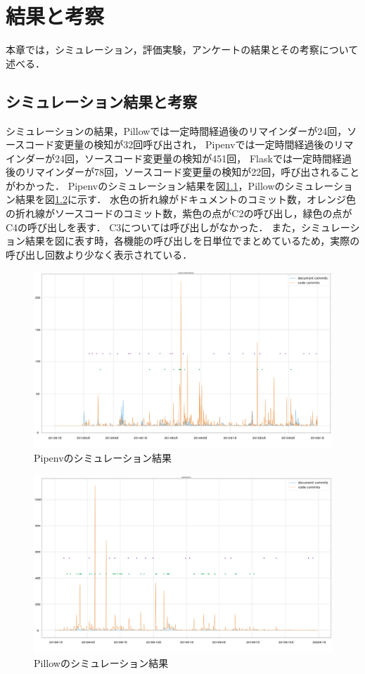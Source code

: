 \chapter{結果と考察}
本章では，シミュレーション，評価実験，アンケートの結果とその考察について述べる．

\section{シミュレーション結果と考察}
シミュレーションの結果，Pillowでは一定時間経過後のリマインダーが24回，ソースコード変更量の検知が32回呼び出され，
Pipenvでは一定時間経過後のリマインダーが24回，ソースコード変更量の検知が451回，
Flaskでは一定時間経過後のリマインダーが78回，ソースコード変更量の検知が22回，呼び出されることがわかった．
Pipenvのシミュレーション結果を図\ref{sim1}，Pillowのシミュレーション結果を図\ref{sim2}に示す．
水色の折れ線がドキュメントのコミット数，オレンジ色の折れ線がソースコードのコミット数，紫色の点がC2の呼び出し，緑色の点がC4の呼び出しを表す．
C3については呼び出しがなかった．
また，シミュレーション結果を図に表す時，各機能の呼び出しを日単位でまとめているため，実際の呼び出し回数より少なく表示されている．

\begin{figure}[H]
    \centering
    \includegraphics[width=14cm]{images/sim1.png}
    \caption{Pipenvのシミュレーション結果}
    \label{sim1}
\end{figure}

\begin{figure}[H]
    \centering
    \includegraphics[width=14cm]{images/sim2.png}
    \caption{Pillowのシミュレーション結果}
    \label{sim2}
\end{figure}

